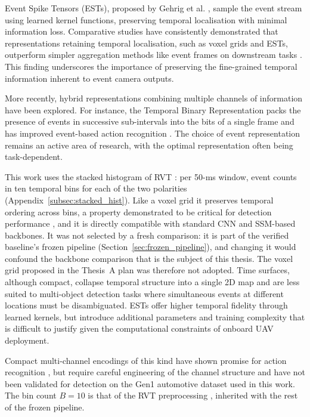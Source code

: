 \documentclass[11pt, a4paper]{report}
\begin{document}
Event Spike Tensors (ESTs), proposed by Gehrig et al. \cite{gehrig2019end}, sample the event stream using learned kernel functions, preserving temporal localisation with minimal information loss. Comparative studies have consistently demonstrated that representations retaining temporal localisation, such as voxel grids and ESTs, outperform simpler aggregation methods like event frames on downstream tasks \cite{gehrig2019end}. This finding underscores the importance of preserving the fine-grained temporal information inherent to event camera outputs. 

More recently, hybrid representations combining multiple channels of information have been explored. For instance, the Temporal Binary Representation packs the presence of events in successive sub-intervals into the bits of a single frame and has improved event-based action recognition \cite{innocenti2021temporal}. The choice of event representation remains an active area of research, with the optimal representation often being task-dependent. 

This work uses the stacked histogram of RVT \cite{gehrig2023recurrent}: per 50-ms window, event counts in ten temporal bins for each of the two polarities (Appendix~\ref{subsec:stacked_hist}). Like a voxel grid it preserves temporal ordering across bins, a property demonstrated to be critical for detection performance \cite{gehrig2019end}, and it is directly compatible with standard CNN and SSM-based backbones. It was not selected by a fresh comparison: it is part of the verified baseline's frozen pipeline (Section~\ref{sec:frozen_pipeline}), and changing it would confound the backbone comparison that is the subject of this thesis. The voxel grid proposed in the Thesis~A plan was therefore not adopted. Time surfaces, although compact, collapse temporal structure into a single 2D map and are less suited to multi-object detection tasks where simultaneous events at different locations must be disambiguated. ESTs offer higher temporal fidelity through learned kernels, but introduce additional parameters and training complexity that is difficult to justify given the computational constraints of onboard UAV deployment. 

Compact multi-channel encodings of this kind have shown promise for action recognition \cite{innocenti2021temporal}, but require careful engineering of the channel structure and have not been validated for detection on the Gen1 automotive dataset used in this work. The bin count $B = 10$ is that of the RVT preprocessing \cite{gehrig2023recurrent}, inherited with the rest of the frozen pipeline. 
\end{document}
